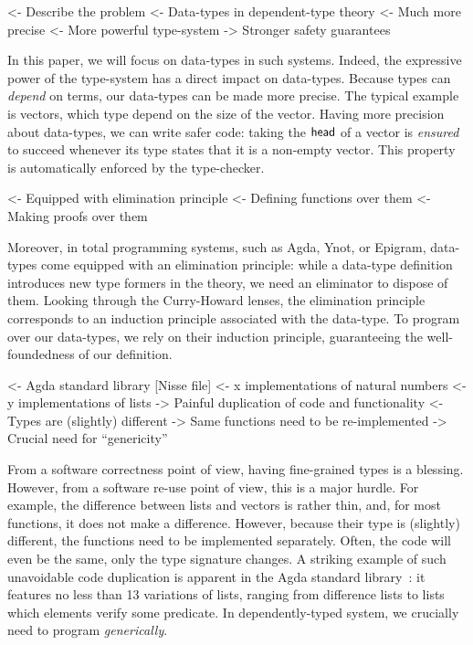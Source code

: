 \documentclass[preprint
              , authoryear
              ]{sigplanconf}
\newenvironment{wstructure}{\comment}{\endcomment}
\begin{document}
\begin{wstructure}
<- Describe the problem
    <- Data-types in dependent-type theory
        <- Much more precise
            <- More powerful type-system
            -> Stronger safety guarantees
\end{wstructure}

In this paper, we will focus on data-types in such systems. Indeed,
the expressive power of the type-system has a direct impact on
data-types. Because types can \emph{depend} on terms, our data-types
can be made more precise. The typical example is vectors, which type
depend on the size of the vector. Having more precision about
data-types, we can write safer code: taking the $\textsf{head}$ of a
vector is \emph{ensured} to succeed whenever its type states that it
is a non-empty vector. This property is automatically enforced by the
type-checker.

\begin{wstructure}
        <- Equipped with elimination principle
            <- Defining functions over them
            <- Making proofs over them
\end{wstructure}

Moreover, in total programming systems, such as Agda, Ynot, or
Epigram, data-types come equipped with an elimination principle: while
a data-type definition introduces new type formers in the theory, we
need an eliminator to dispose of them. Looking through the
Curry-Howard lenses, the elimination principle corresponds to an
induction principle associated with the data-type. To program over our
data-types, we rely on their induction principle, guaranteeing the
well-foundedness of our definition.

\begin{wstructure}
    <- Agda standard library [Nisse file]
        <- x implementations of natural numbers
        <- y implementations of lists
        -> Painful duplication of code and functionality
            <- Types are (slightly) different
                -> Same functions need to be re-implemented 
        -> Crucial need for ``genericity''
\end{wstructure}

From a software correctness point of view, having fine-grained types
is a blessing. However, from a software re-use point of view, this is
a major hurdle. For example, the difference between lists and vectors
is rather thin, and, for most functions, it does not make a
difference. However, because their type is (slightly) different, the
functions need to be implemented separately. Often, the code will even
be the same, only the type signature changes. A striking example of
such unavoidable code duplication is apparent in the Agda standard
library~\cite{nisse:asl}: it features no less than 13 variations of
lists, ranging from difference lists to lists which elements verify
some predicate. In dependently-typed system, we crucially need to
program \emph{generically}.
\end{document}
